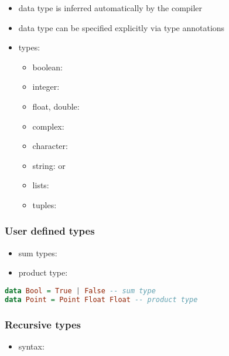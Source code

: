 \documentclass[a4paper,landscape,10pt]{article}
\begin{document}
\begin{multicols*}{2}
  \begin{itemize}
    \item data type is inferred automatically by the compiler
    \item data type can be specified explicitly via type annotations \ihaskell{::}
    \item types:
          \begin{itemize}
            \item boolean: 
            \item integer: 
            \item float, double: 
            \item complex: 
            \item character: 
            \item string: \ihaskell{["a", "b", "c"]} or 
            \item lists: \ihaskell{[1, 2, 3]}
            \item tuples: 
          \end{itemize}
  \end{itemize}

  \subsubsection{User defined types}

  \begin{itemize}
    \item sum types: 
    \item product type: 
  \end{itemize}

  \begin{lstlisting}[language=Haskell]
data Bool = True | False -- sum type
data Point = Point Float Float -- product type
\end{lstlisting}

  \subsubsection{Recursive types}

  \begin{itemize}
    \item syntax: 
  \end{itemize}


\end{multicols*}
\end{document}
